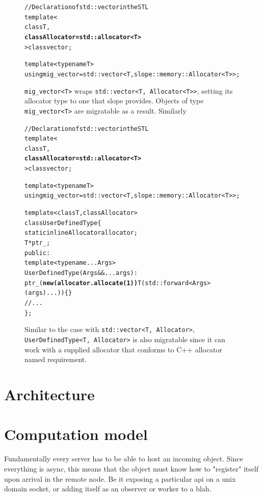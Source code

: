 \begin{figure}[H]
\begin{alltt}
// Declaration of std::vector in the STL
template<
    class T,
    \textbf{class Allocator = std::allocator<T>}
> class vector;

template<typename T>
using mig_vector = std::vector<T, slope::memory::Allocator<T>>;

\end{alltt}
\caption{
\texttt{mig\_vector<T>} wraps \texttt{std{::}vector<T, Allocator<T>>}, setting
its allocator type to one that slope provides. Objects of type
\texttt{mig\_vector<T>} are migratable as a result. Similarly
}
\end{figure}





\begin{figure}[H]
\begin{alltt}
// Declaration of std::vector in the STL
template<
    class T,
    \textbf{class Allocator = std::allocator<T>}
> class vector;

template<typename T>
using mig_vector = std::vector<T, slope::memory::Allocator<T>>;

template<class T, class Allocator>
class UserDefinedType \{
  static inline Allocator allocator;
  T *ptr_;
 public:
  template<typename... Args>
  UserDefinedType(Args&&... args):
    ptr_(\textbf{new (allocator.allocate(1))} T(std::forward<Args>(args)...)) \{ \}
  // ...
\};

\end{alltt}
\caption{
Similar to the case with \texttt{std{::}vector<T, Allocator>},
\texttt{UserDefinedType<T, Allocator>} is also migratable since it can work
with a supplied allocator that conforms to C++ allocator named requirement.
}
\end{figure}




\section{Architecture}

\section{Computation model}
Fundamentally every server has to be able to host an incoming object.
Since everything is async, this means that the object must know how to
"register" itself upon arrival in the remote node. Be it exposing a particular
api on a unix domain socket, or adding itself as an observer or worker to a blah.

